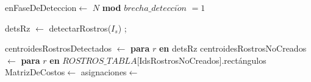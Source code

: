 \documentclass[a4paper,openright,12pt]{report}
\begin{document}
\begin{algorithm}
\begin{algorithmic}[1]
      \State enFaseDeDeteccion$\gets$ $N$ \textbf{mod} $brecha\_detecci\acute on$ $= 1$ \label{lst:line:C}

       \label{lst:line:inicioFaseDetect}
        \State detsRz $\gets$ detectarRostros($I_{s}$)  \label{lst:line:deteccion}
          \State {};
          \label{lst:line:crearYAgregarRostrosA}
        \EndIf

          \label{lst:line:checkIfHungarian}
          \State centroidesRostrosDetectados $\gets$
              \lbrack{} \textbf{para} $r$ \textbf{en} detsRz\rbrack
          \label{lst:line:costMatrixInit}
          \State centroidesRostrosNoCreados $\gets$
              \lbrack {} \textbf{para} $r$ \textbf{en} $ROSTROS\_TABLA$[IdsRostrosNoCreados].rectángulos\rbrack
          \State MatrizDeCostos$\leftarrow$
          \label{lst:line:costMatrixEnd}
          \State asignaciones$\gets$
          \Comment{\textcolor{red}{Continúa...}}
  \end{algorithmic}
\end{algorithm}

\clearpage
\end{document}
